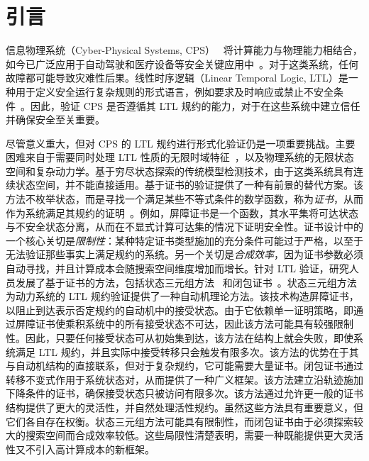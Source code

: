 ﻿\section{引言}
信息物理系统（Cyber-Physical Systems, CPS）~\cite{baheti2011cyber} 将计算能力与物理能力相结合，如今已广泛应用于自动驾驶和医疗设备等安全关键应用中~\cite{rajkumar2010cyber}。对于这类系统，任何故障都可能导致灾难性后果。线性时序逻辑（Linear Temporal Logic, LTL）是一种用于定义安全运行复杂规则的形式语言，例如要求及时响应或禁止不安全条件~\cite{pnueli1977temporal}。因此，验证 CPS 是否遵循其 LTL 规约的能力，对于在这些系统中建立信任并确保安全至关重要。

尽管意义重大，但对 CPS 的 LTL 规约进行形式化验证仍是一项重要挑战。主要困难来自于需要同时处理 LTL 性质的无限时域特征~\cite{baier2008principles}，以及物理系统的无限状态空间和复杂动力学。基于穷尽状态探索的传统模型检测技术，由于这类系统具有连续状态空间，并不能直接适用。基于证书的验证提供了一种有前景的替代方案。该方法不枚举状态，而是寻找一个满足某些不等式条件的数学函数，称为\emph{证书}，从而作为系统满足其规约的证明~\cite{prajna2004safety}。例如，屏障证书是一个函数，其水平集将可达状态与不安全状态分离，从而在不显式计算可达集的情况下证明安全性。证书设计中的一个核心关切是\emph{限制性}：某种特定证书类型施加的充分条件可能过于严格，以至于无法验证那些事实上满足规约的系统。另一个关切是\emph{合成效率}，因为证书参数必须自动寻找，并且计算成本会随搜索空间维度增加而增长。针对 LTL 验证，研究人员发展了基于证书的方法，包括状态三元组方法~\cite{wongpiromsarn2015automata} 和闭包证书~\cite{murali2024closure}。状态三元组方法为动力系统的 LTL 规约验证提供了一种自动机理论方法。该技术构造屏障证书，以阻止到达表示否定规约的自动机中的接受状态。由于它依赖单一证明策略，即通过屏障证书使乘积系统中的所有接受状态不可达，因此该方法可能具有较强限制性。因此，只要任何接受状态可从初始集到达，该方法在结构上就会失败，即使系统满足 LTL 规约，并且实际中接受转移只会触发有限多次。该方法的优势在于其与自动机结构的直接联系，但对于复杂规约，它可能需要大量证书。闭包证书通过转移不变式作用于系统状态对，从而提供了一种广义框架。该方法建立沿轨迹施加下降条件的证书，确保接受状态只被访问有限多次。该方法通过允许更一般的证书结构提供了更大的灵活性，并自然处理活性规约。虽然这些方法具有重要意义，但它们各自存在权衡。状态三元组方法可能具有限制性，而闭包证书由于必须探索较大的搜索空间而合成效率较低。这些局限性清楚表明，需要一种既能提供更大灵活性又不引入高计算成本的新框架。

